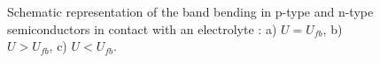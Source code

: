 \begin{figure}[H]
\centering

\caption{Schematic representation of the band bending in p-type and n-type 
semiconductors in contact with an electrolyte \citep{memming2008, bard2002}:
 a) $U = U_{fb}$, b) $U > U_{fb}$, c) $U < U_{fb}$.}
\label{fig_band_bending}

\end{figure}
